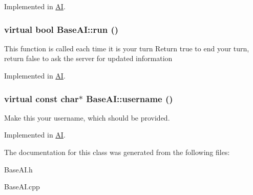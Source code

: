 Implemented in \hyperlink{classAI_aa4e58e11bbbdb040e6b12f8706763a00}{AI}.

\hypertarget{classBaseAI_ad60148e7e9e450ce47432b07b4db1ed6}{
\subsubsection[{run}]{\setlength{\rightskip}{0pt plus 5cm}virtual bool BaseAI::run ()}}
\label{classBaseAI_ad60148e7e9e450ce47432b07b4db1ed6}
This function is called each time it is your turn Return true to end your turn, return false to ask the server for updated information 

Implemented in \hyperlink{classAI_a3c4746756b699cee5225597506521a39}{AI}.

\hypertarget{classBaseAI_aef082fbf306fec04515ed5ed3b1ba582}{
\subsubsection[{username}]{\setlength{\rightskip}{0pt plus 5cm}virtual const char$\ast$ BaseAI::username ()}}
\label{classBaseAI_aef082fbf306fec04515ed5ed3b1ba582}
Make this your username, which should be provided. 

Implemented in \hyperlink{classAI_a529ac74a6f88a82abb1edd87847203e1}{AI}.



The documentation for this class was generated from the following files:\begin{DoxyCompactItemize}
\item 
BaseAI.h\item 
BaseAI.cpp\end{DoxyCompactItemize}
